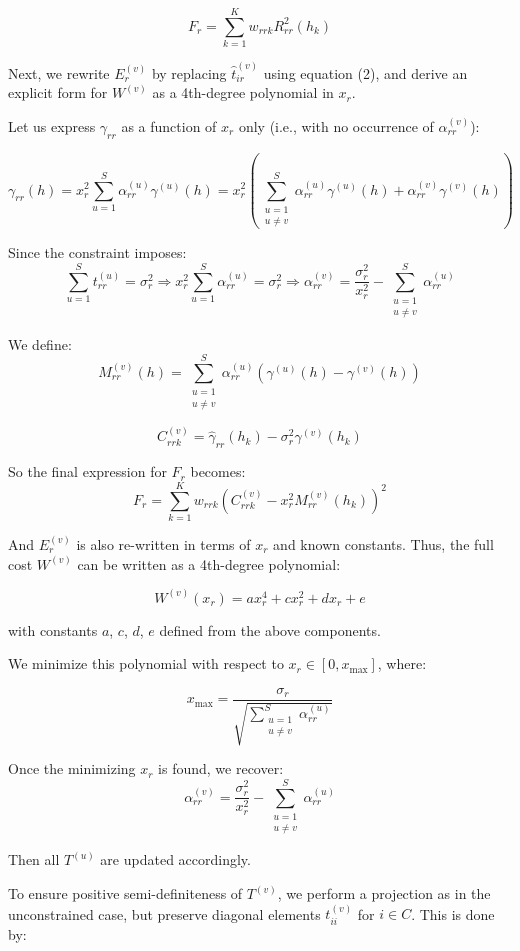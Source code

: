 \documentclass[11pt]{article}
\begin{document}
\[
F_r = \sum_{k=1}^K w_{rrk} R_{rr}^2(h_k)
\]

Next, we rewrite $E_r^{(v)}$ by replacing $\hat{t}_{ir}^{(v)}$ using equation (2), and derive an explicit form for $W^{(v)}$ as a 4th-degree polynomial in $x_r$.

Let us express $\gamma_{rr}$ as a function of $x_r$ only (i.e., with no occurrence of $\alpha_{rr}^{(v)}$):

\[
\gamma_{rr}(h) = x_r^2 \sum_{u=1}^S \alpha_{rr}^{(u)} \gamma^{(u)}(h) = x_r^2 \left( \sum_{\substack{u=1\\u \ne v}}^S \alpha_{rr}^{(u)} \gamma^{(u)}(h) + \alpha_{rr}^{(v)} \gamma^{(v)}(h) \right)
\]

Since the constraint imposes:
\[
\sum_{u=1}^S t_{rr}^{(u)} = \sigma_r^2 \Rightarrow x_r^2 \sum_{u=1}^S \alpha_{rr}^{(u)} = \sigma_r^2 \Rightarrow \alpha_{rr}^{(v)} = \frac{\sigma_r^2}{x_r^2} - \sum_{\substack{u=1\\u \ne v}}^S \alpha_{rr}^{(u)}
\]

We define:
\[
M_{rr}^{(v)}(h) = \sum_{\substack{u=1\\u \ne v}}^S \alpha_{rr}^{(u)} \left( \gamma^{(u)}(h) - \gamma^{(v)}(h) \right)
\]

\[
C_{rrk}^{(v)} = \hat{\gamma}_{rr}(h_k) - \sigma_r^2 \gamma^{(v)}(h_k)
\]

So the final expression for $F_r$ becomes:
\[
F_r = \sum_{k=1}^K w_{rrk} \left( C_{rrk}^{(v)} - x_r^2 M_{rr}^{(v)}(h_k) \right)^2
\]

And $E_r^{(v)}$ is also re-written in terms of $x_r$ and known constants. Thus, the full cost $W^{(v)}$ can be written as a 4th-degree polynomial:

\[
W^{(v)}(x_r) = a x_r^4 + c x_r^2 + d x_r + e
\]

with constants $a$, $c$, $d$, $e$ defined from the above components.

We minimize this polynomial with respect to $x_r \in [0, x_{\max}]$, where:

\[
x_{\max} = \frac{\sigma_r}{\sqrt{\sum_{\substack{u=1\\u \ne v}}^S \alpha_{rr}^{(u)}}}
\]

Once the minimizing $x_r$ is found, we recover:
\[
\alpha_{rr}^{(v)} = \frac{\sigma_r^2}{x_r^2} - \sum_{\substack{u=1\\u \ne v}}^S \alpha_{rr}^{(u)}
\]

Then all $T^{(u)}$ are updated accordingly.

To ensure positive semi-definiteness of $T^{(v)}$, we perform a projection as in the unconstrained case, but preserve diagonal elements $t_{ii}^{(v)}$ for $i \in C$. This is done by:
\end{document}
